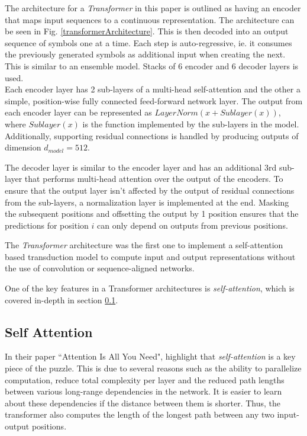\documentclass[a4paper,12pt]{report}
\begin{document}
			The architecture for a \textit{Transformer} in this paper is outlined as having an encoder that maps input sequences to a continuous representation. The architecture can be seen in Fig. \ref{transformerArchitecture}. This is then decoded into an output sequence of symbols one at a time. Each step is auto-regressive, ie. it consumes the previously generated symbols as additional input when creating the next. This is similar to an ensemble model. Stacks of 6 encoder and 6 decoder layers is used.\\
			Each encoder layer has 2 sub-layers of a multi-head self-attention and the other a simple, position-wise fully connected feed-forward network layer. The output from each encoder layer can be represented as $  LayerNorm(x + Sublayer(x)) $, where $ Sublayer(x) $ is the function implemented by the sub-layers in the model. Additionally, supporting residual connections is handled by producing outputs of dimension $ d_{model}=512 $.

			The decoder layer is similar to the encoder layer and has an additional 3rd sub-layer that performs multi-head attention over the output of the encoders. To ensure that the output layer isn't affected by the output of residual connections from the sub-layers, a normalization layer is implemented at the end. Masking the subsequent positions and offsetting the output by 1 position ensures that the predictions for position $ i $ can only depend on outputs from previous positions.

            The \textit{Transformer} architecture was the first one to implement a self-attention based transduction model to compute input and output representations without the use of convolution or sequence-aligned networks.

			One of the key features in a Transformer architectures is \textit{self-attention}, which is covered in-depth in section \ref{231}.

			\subsection{Self Attention}\label{231}

            In their paper ``Attention Is All You Need", \citep{atayl} highlight that \textit{self-attention} is a key piece of the puzzle. This is due to several reasons such as the ability to parallelize computation, reduce total complexity per layer and the reduced path lengths between various long-range dependencies in the network. It is easier to learn about these dependencies if the distance between them is shorter.
            Thus, the transformer also computes the length of the longest path between any two input-output positions.
\end{document}
